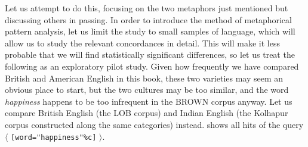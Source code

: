Let us attempt to do this, focusing on the two metaphors  just mentioned but discussing others in passing. In order to introduce the method of metaphorical pattern analysis,  let us limit the study to small samples of language, which will allow us to study the relevant concordances  in detail. This will make it less probable that we will find statistically significant differences, so let us treat the following as an exploratory pilot study. Given how frequently we have compared British  and American  English in this book, these two varieties  may seem an obvious place to start, but the two cultures  may be too similar, and the word \textit{happiness}  happens to be too infrequent in the BROWN  corpus anyway. Let us compare British English (the LOB  corpus) and Indian  English (the Kolhapur  corpus constructed along the same categories) instead.  shows all hits of the query $\langle$ \texttt{[word="happiness"\%c]} $\rangle$.

